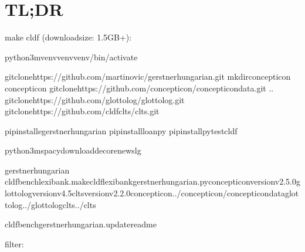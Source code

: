 \documentclass[letterpaper,10pt,english]{sphinxmanual}
\begin{document}
\sphinxstepscope


\chapter{TL;DR}
\label{\detokenize{TL;DR:id1}}\label{\detokenize{TL;DR::doc}}\label{\detokenize{TL;DR:module-gerstnerhungariancommands.__init__}}
\sphinxAtStartPar
make cldf (downloadsize: 1.5GB+):

\begin{sphinxVerbatim}[commandchars=\\\{\}]
python3\PYGZhy{}mvenvvenvvenv/bin/activate

gitclonehttps://github.com/martino\PYGZhy{}vic/gerstnerhungarian.git
mkdirconcepticon
concepticon
gitclonehttps://github.com/concepticon/concepticon\PYGZhy{}data.git
..
gitclonehttps://github.com/glottolog/glottolog.git
gitclonehttps://github.com/cldf\PYGZhy{}clts/clts.git

pipinstall\PYGZhy{}egerstnerhungarian
pipinstallloanpy
pipinstallpytest\PYGZhy{}cldf

python3\PYGZhy{}mspacydownloadde\PYGZus{}core\PYGZus{}news\PYGZus{}lg

gerstnerhungarian
cldfbenchlexibank.makecldflexibank\PYGZus{}gerstnerhungarian.py\PYGZhy{}\PYGZhy{}concepticon\PYGZhy{}versionv2.5.0\PYGZhy{}\PYGZhy{}glottolog\PYGZhy{}versionv4.5\PYGZhy{}\PYGZhy{}clts\PYGZhy{}versionv2.2.0\PYGZhy{}\PYGZhy{}concepticon../concepticon/concepticon\PYGZhy{}data\PYGZhy{}\PYGZhy{}glottolog../glottolog\PYGZhy{}\PYGZhy{}clts../clts

cldfbenchgerstnerhungarian.update\PYGZus{}readme
\end{sphinxVerbatim}

\sphinxAtStartPar
filter:
\end{document}
